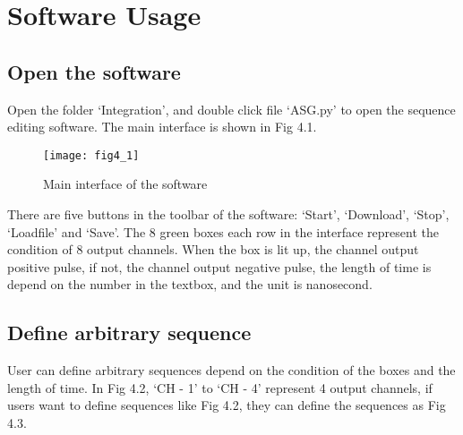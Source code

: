 \chapter{\heiti Software Usage}
\section{\heiti Open the software}
\hspace{-0.2cm}Open the folder `Integration', and double click file `ASG.py' to open the sequence editing software. The main interface is shown in Fig 4.1.
\begin{figure}[ht]
\centering
\texttt{[image: fig4\_1]}
\caption{\hspace{0.2cm}Main interface of the software}
\end{figure}

\hspace{-0.2cm}There are five buttons in the toolbar of the software: `Start', `Download', `Stop', `Loadfile' and `Save'. The 8 green boxes each row in the interface represent the condition of  8 output channels. When the box is lit up, the channel output positive pulse, if  not, the channel output negative pulse, the length of time is depend on the number in the textbox, and the unit is nanosecond.

\section{\heiti Define arbitrary sequence}
\hspace{-0.2cm}User can define arbitrary sequences depend on the condition of the boxes and the length of time. In Fig 4.2, `CH - 1' to `CH - 4' represent 4 output channels, if users want to define sequences like Fig 4.2, they can define the sequences as Fig 4.3.

